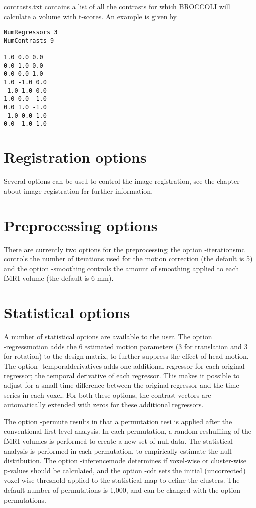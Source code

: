 contrasts.txt contains a list of all the contrasts for which BROCCOLI will calculate a volume with t-scores. An example is given by

\begin{verbatim}
NumRegressors 3
NumContrasts 9

1.0 0.0 0.0
0.0 1.0 0.0
0.0 0.0 1.0
1.0 -1.0 0.0
-1.0 1.0 0.0
1.0 0.0 -1.0
0.0 1.0 -1.0
-1.0 0.0 1.0
0.0 -1.0 1.0
\end{verbatim}


\section{Registration options}

Several options can be used to control the image registration, see the chapter about image registration for further information.

\section{Preprocessing options}

There are currently two options for the preprocessing; the option -iterationsmc controls the number of iterations used for the motion correction (the default is 5) and the option -smoothing controls the amount of smoothing applied to each fMRI volume (the default is 6 mm). 

\section{Statistical options}

A number of statistical options are available to the user. The option \\-regressmotion adds the 6 estimated motion parameters (3 for translation and 3 for rotation) to the design matrix, to further suppress the effect of head motion. The option -temporalderivatives adds one additional regressor for each original regressor; the temporal derivative of each regressor. This makes it possible to adjust for a small time difference between the original regressor and the time series in each voxel. For both these options, the contrast vectors are automatically extended with zeros for these additional regressors.

The option -permute results in that a permutation test is applied after the conventional first level analysis. In each permutation, a random reshuffling of the fMRI volumes is performed to create a new set of null data. The statistical analysis is performed in each permutation, to empirically estimate the null distribution. The option -inferencemode determines if voxel-wise or cluster-wise p-values should be calculated, and the option -cdt sets the initial (uncorrected) voxel-wise threshold applied to the statistical map to define the clusters. The default number of permutations is 1,000, and can be changed with the option -permutations.

